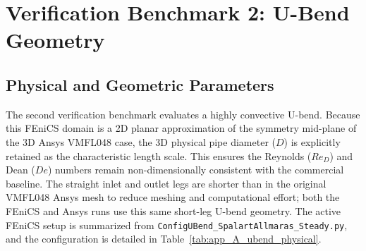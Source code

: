 \FloatBarrier

\section{Verification Benchmark 2: U-Bend Geometry}
\label{sec:app_A_ubend}

\subsection{Physical and Geometric Parameters}
\label{subsec:app_A_ubend_physical}
The second verification benchmark evaluates a highly convective U-bend. Because this FEniCS domain is a 2D planar approximation of the symmetry mid-plane of the 3D Ansys VMFL048 case, the 3D physical pipe diameter ($D$) is explicitly retained as the characteristic length scale. This ensures the Reynolds ($Re_D$) and Dean ($De$) numbers remain non-dimensionally consistent with the commercial baseline. The straight inlet and outlet legs are shorter than in the original VMFL048 Ansys mesh to reduce meshing and computational effort; both the FEniCS and Ansys runs use this same short-leg U-bend geometry. The active FEniCS setup is summarized from \texttt{ConfigUBend\_SpalartAllmaras\_Steady.py}, and the configuration is detailed in Table~\ref{tab:app_A_ubend_physical}.

